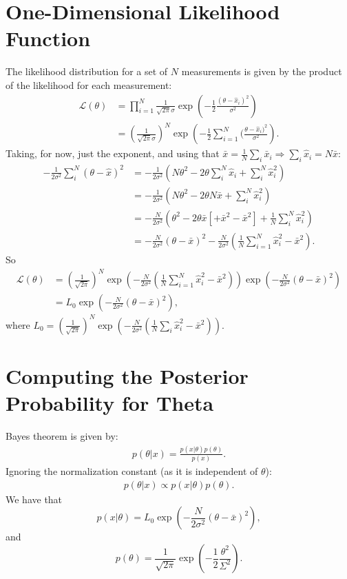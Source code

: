 \documentclass[a4paper,11pt,twoside]{article}
\begin{document}
\section{One-Dimensional Likelihood Function}
\label{sec:likelihood}
The likelihood distribution for a set of $N$ measurements is given by the product of the likelihood for each measurement:
\begin{align*}
	\mathcal{L}(\theta) &= \prod_{i=1}^{N} \frac{1}{\sqrt{2\pi}\sigma}\exp\left(-\frac{1}{2}\frac{(\theta - \hat{x}_i)^2}{\sigma^2}\right)
	\\ &= \left(\frac{1}{\sqrt{2\pi}\sigma}\right)^N \exp\left(-\frac{1}{2}\sum_{i=1}^{N}(\frac{\theta - \hat{x}_i)^2}{\sigma^2}\right).
\end{align*}
Taking, for now, just the exponent, and using that $\bar{x} = \frac{1}{N} \sum_i \bar{x}_i \Rightarrow \sum_i \hat{x}_i = N \bar{x}$:
\begin{align*}
	-\frac{1}{2\sigma^2}\sum_i^N(\theta - \hat{x})^2 &= -\frac{1}{2\sigma^2}(N\theta^2 - 2\theta \sum_i^N\hat{x}_i + \sum_i^N \hat{x}_i^2) 
	\\ &= -\frac{1}{2\sigma^2}(N\theta^2 - 2\theta N \bar{x} + \sum_i^N \hat{x}_i^2) 
	\\ &= -\frac{N}{2\sigma^2} (\theta^2 - 2\theta \bar{x} [ + \bar{x}^2 - \bar{x}^2]  + \frac{1}{N} \sum_i^N \hat{x}_i^2) 
	\\ &= -\frac{N}{2 \sigma^2} (\theta - \bar{x})^2 - \frac{N}{2 \sigma^2}(\frac{1}{N} \sum_{i=1}^{N} \hat{x}_i^2 - \bar{x}^2).
\end{align*}
So
\begin{align*}
	\mathcal{L}(\theta) &= \left( \frac{1}{\sqrt{2\pi}} \right)^N \exp \left(- \frac{N}{2 \sigma^2}(\frac{1}{N} \sum_{i=1}^{N} \hat{x}_i^2 - \bar{x}^2)\right) \exp \left(-\frac{N}{2 \sigma^2} (\theta - \bar{x})^2 \right)
	\\ &= L_0 \exp \left( -\frac{N}{2 \sigma^2} (\theta - \bar{x})^2 \right),
\end{align*}
where $L_0 = \left( \frac{1}{\sqrt{2\pi}} \right)^N \exp \left(- \frac{N}{2 \sigma^2}(\frac{1}{N} \sum_i \hat{x}_i^2 - \bar{x}^2)\right)$.

\section{Computing the Posterior Probability for Theta}
Bayes theorem is given by:
\begin{align*}
	p(\theta|x) = \frac{p(x|\theta)p(\theta)}{p(x)}.
\end{align*}
Ignoring the normalization constant (as it is independent of $\theta$):
\begin{align*}
	p(\theta|x) \propto p(x|\theta)p(\theta).
\end{align*}
We have that
\begin{equation*}
	p(x|\theta) = L_0 \exp \left( -\frac{N}{2 \sigma^2} (\theta - \bar{x})^2 \right),
\end{equation*}
and
\begin{equation*}
	p(\theta) =  \frac{1}{\sqrt{2\pi}}\exp\left(-\frac{1}{2}\frac{\theta^2}{\Sigma^2}\right).
\end{equation*}
\end{document}
